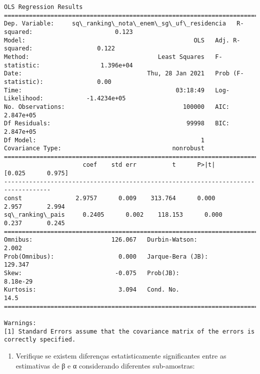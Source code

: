 \documentclass[11pt]{article}
\providecommand{\tightlist}{%
      \setlength{\itemsep}{0pt}\setlength{\parskip}{0pt}}
\begin{document}
    \begin{Verbatim}[commandchars=\\\{\}]
                                      OLS Regression Results                                     
=================================================================================================
Dep. Variable:     sq\_ranking\_nota\_enem\_sg\_uf\_residencia   R-squared:                       0.123
Model:                                               OLS   Adj. R-squared:                  0.122
Method:                                    Least Squares   F-statistic:                 1.396e+04
Date:                                   Thu, 28 Jan 2021   Prob (F-statistic):               0.00
Time:                                           03:18:49   Log-Likelihood:            -1.4234e+05
No. Observations:                                 100000   AIC:                         2.847e+05
Df Residuals:                                      99998   BIC:                         2.847e+05
Df Model:                                              1                                         
Covariance Type:                               nonrobust                                         
===================================================================================
                      coef    std err          t      P>|t|      [0.025      0.975]
-----------------------------------------------------------------------------------
const               2.9757      0.009    313.764      0.000       2.957       2.994
sq\_ranking\_pais     0.2405      0.002    118.153      0.000       0.237       0.245
==============================================================================
Omnibus:                      126.067   Durbin-Watson:                   2.002
Prob(Omnibus):                  0.000   Jarque-Bera (JB):              129.347
Skew:                          -0.075   Prob(JB):                     8.18e-29
Kurtosis:                       3.094   Cond. No.                         14.5
==============================================================================

Warnings:
[1] Standard Errors assume that the covariance matrix of the errors is correctly specified.

    \end{Verbatim}

    \begin{enumerate}
\def\labelenumi{\arabic{enumi}.}
\setcounter{enumi}{3}
\tightlist
\item
  Verifique se existem diferenças estatisticamente significantes entre
  as estimativas de β e α considerando diferentes sub-amostras:
\end{enumerate}
\end{document}
